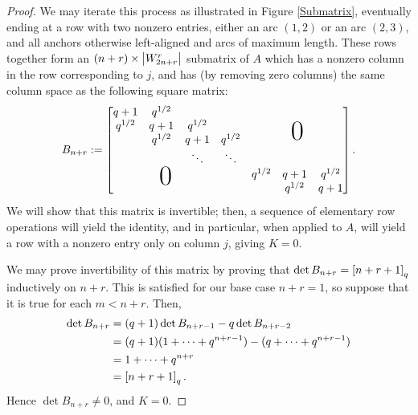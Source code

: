 \documentclass{amsart}
\begin{document}
\begin{proof}
  We may iterate this process as illustrated in Figure \ref{Submatrix}, eventually ending at a row with two nonzero entries, either an arc $(1,2)$ or an arc $(2,3)$, and all anchors otherwise left-aligned and arcs of maximum length.
  These rows together form an $(n + r) \times \left| W_{2n + r}^r \right|$ submatrix of $A$ which has a nonzero column in the row corresponding to $j$, and has (by removing zero columns) the same column space as the following square matrix:
  \newcommand*\bigzero{\makebox(0,15){\text{\Huge0}}}
  \newcommand*\bigzerotwo{\makebox(-20,15){\text{\Huge0}}}
  \begin{equation}\label{Bnr}
    B_{n + r} := \begin{bmatrix}
      \begin{matrix}
      q + 1 & q^{1/2} & \\
      q^{1/2} & q + 1 & q^{1/2}\\
      & q^{1/2} & q + 1 & q^{1/2}\\
      &  & \ddots & \ddots
      \end{matrix}
      &   \bigzero\\
      \bigzerotwo & \begin{matrix}
        q^{1/2} & q+1 & q^{1/2}\\
        &  q^{1/2} & q + 1
       \end{matrix}
    \end{bmatrix}.
  \end{equation}
  We will show that this matrix is invertible;
  then, a sequence of elementary row operations will yield the identity, and in particular, when applied to $A$, will yield a row with a nonzero entry only on column $j$, giving $K = 0$.

  We may prove invertibility of this matrix by proving that $\det B_{n + r} = \left[ n + r + 1 \right]_q$ inductively on $n+r$.
  This is satisfied for our base case $n + r = 1$, so suppose that it is true for each $m < n + r$.
  Then,
  \begin{align*}
    \det B_{n+r} &= (q + 1) \det B_{n + r - 1} - q \det B_{n + r - 2}\\
    &= (q + 1)(1 + \dots + q^{n + r - 1}) - (q + \dots + q^{n + r - 1})\\
    &= 1 + \dots + q^{n + r}\\
    &= \left[ n + r + 1 \right]_q.
  \end{align*}
  Hence $\det B_{n + r} \neq 0$, and $K = 0$.
\end{proof}
\end{document}
